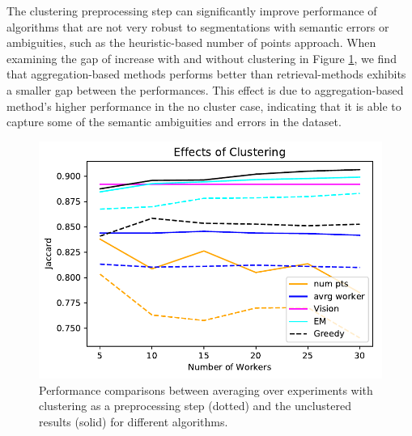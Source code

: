 \par The clustering preprocessing step can significantly improve performance of algorithms that are not very robust to segmentations with semantic errors or ambiguities, such as the heuristic-based number of points approach. When examining the gap of increase with and without clustering in Figure \ref{cluster_effect}, we find that aggregation-based methods performs better than retrieval-methods exhibits a smaller gap between the performances. This effect is due to aggregation-based method's higher performance in the no cluster case, indicating that it is able to capture some of the semantic ambiguities and errors in the dataset.
\begin{figure}[ht!]
      \centering
      \includegraphics[width=\linewidth]{plots/Effects_of_clustering.pdf}
      \caption{Performance comparisons between averaging over experiments with clustering as a preprocessing step (dotted) and the unclustered results (solid) for different algorithms.}
      \label{cluster_effect}
\end{figure}
